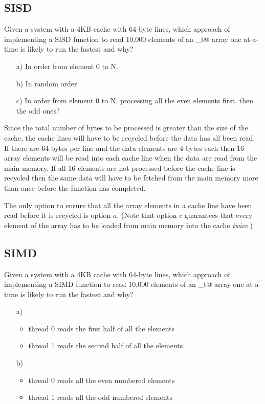 \documentclass[10pt]{article}
\begin{document}
\subsection{SISD}
Given a system with a 4KB cache with 64-byte lines, which approach of implementing a 
SISD function to read 10,000 elements of an _t@ array one at-a-time is likely 
to run the fastest and why?

\begin{itemize}
\item[a)] In order from element 0 to N.
\item[b)] In random order.
\item[c)] In order from element 0 to N, processing all the even elements first, then the odd ones?
\end{itemize}

Since the total number of bytes to be processed is greater than the size of the cache,
the cache lines will have to be recycled before the data has all been read.  
If there are 64-bytes per line and the data elements are 4-bytes each
then 16 array elements will be read into each cache line when the data
are read from the main memory.  
If all 16 elements are not processed before the cache line is recycled then the same 
data will have to be fetched from the main memory more than once before the
function has completed.

The only option to ensure that all the array elements in a cache line have been read 
before it is recycled is option $a$.  (Note that option $c$ guarantees that every
element of the array has to be loaded from main memory into the cache {\em twice}.) 


\subsection{SIMD}
Given a system with a 4KB cache with 64-byte lines, which approach of implementing a
SIMD function to read 10,000 elements of an _t@ array one at-a-time is likely 
to run the fastest and why?

\begin{itemize}
\item[a)]
\begin{itemize}
\item thread 0 reads the first half of all the elements
\item thread 1 reads the second half of all the elements
\end{itemize}

\item[b)]
\begin{itemize}
\item thread 0 reads all the even numbered elements 
\item thread 1 reads all the odd numbered elements 
\end{itemize}

\end{itemize}
\end{document}
